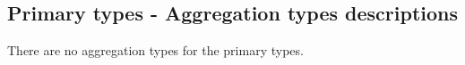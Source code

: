 \subsection{Primary types - Aggregation types descriptions}


There are no aggregation types for the primary types.

